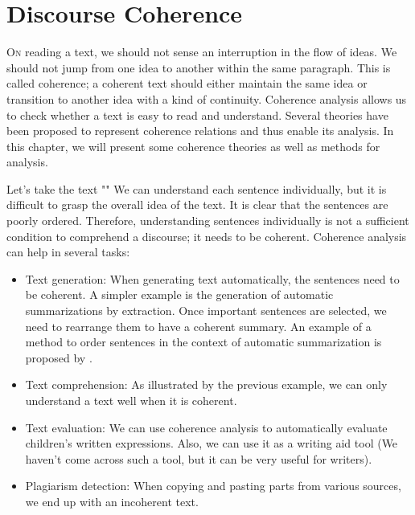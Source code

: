 \documentclass{KBook}
\begin{document}
		\mainmatter
	
\fi

\chapter{Discourse Coherence}

\begin{introduction}
	\lettrine{O}{n} reading a text, we should not sense an interruption in the flow of ideas.
	We should not jump from one idea to another within the same paragraph.
	This is called coherence; a coherent text should either maintain the same idea or transition to another idea with a kind of continuity.
	Coherence analysis allows us to check whether a text is easy to read and understand.
	Several theories have been proposed to represent coherence relations and thus enable its analysis.
	In this chapter, we will present some coherence theories as well as methods for analysis.
\end{introduction}

Let's take the text ""
We can understand each sentence individually, but it is difficult to grasp the overall idea of the text.
It is clear that the sentences are poorly ordered.
Therefore, understanding sentences individually is not a sufficient condition to comprehend a discourse; it needs to be coherent.
Coherence analysis can help in several tasks:
\begin{itemize}
	\item Text generation: When generating text automatically, the sentences need to be coherent.
	A simpler example is the generation of automatic summarizations by extraction.
	Once important sentences are selected, we need to rearrange them to have a coherent summary.
	An example of a method to order sentences in the context of automatic summarization is proposed by \citet{2019-oufaida-al}.
	\item Text comprehension: As illustrated by the previous example, we can only understand a text well when it is coherent.
	\item Text evaluation: We can use coherence analysis to automatically evaluate children's written expressions.
	Also, we can use it as a writing aid tool (We haven't come across such a tool, but it can be very useful for writers).
	\item Plagiarism detection: When copying and pasting parts from various sources, we end up with an incoherent text.
\end{itemize}
\end{document}
